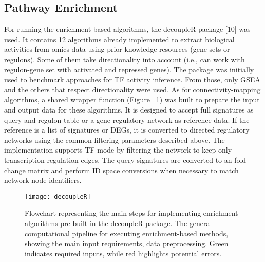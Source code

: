 \subsection{Pathway Enrichment} %
\label{sub:pathway_enrichment}


For running the enrichment-based algorithms, the decoupleR package [10] was used. 
It contains 12 algorithms already implemented to extract biological activities from omics data using prior knowledge resources (gene sets or regulons).
Some of them take directionality into account (i.e., can work with regulon-gene set with activated and repressed genes). 
The package was initially used to benchmark approaches for TF activity inference. From those, only GSEA and the others that respect directionality 
were used. As for connectivity-mapping algorithms, a shared wrapper function (Figure ~\ref{fig:fig6}) was built to prepare the input and 
output data for these algorithms. It is designed to accept full signatures as query and regulon table or a gene regulatory network as reference data. 
If the reference is a list of signatures or DEGs, it is converted to directed regulatory networks using the common filtering parameters described above. 
The implementation supports TF-mode by filtering the network to keep only transcription-regulation edges. The query signatures are converted to an 
fold change matrix and perform ID space conversions when necessary to match network node identifiers. 

\begin{figure}[htbp]
    \centering
    \texttt{[image: decoupleR]}
    \caption{Flowchart representing the main steps for implementing enrichment algorithms pre-built in the decoupleR package. The general computational pipeline for executing enrichment-based methods, showing the main input requirements, data preprocessing. Green indicates required inputs, while red highlights potential errors.}
    \label{fig:fig6}
\end{figure}
